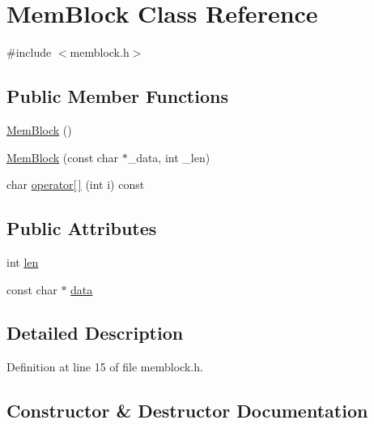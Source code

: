 \hypertarget{class_mem_block}{}\section{Mem\+Block Class Reference}
\label{class_mem_block}


{\ttfamily \#include $<$memblock.\+h$>$}

\subsection*{Public Member Functions}
\begin{DoxyCompactItemize}
\item 
\hyperlink{class_mem_block_a8fdfca8cad8d23202492cc1c6faa1090}{Mem\+Block} ()
\item 
\hyperlink{class_mem_block_af2613f2a070cab85addfe23daa90c4fb}{Mem\+Block} (const char $\ast$\+\_\+data, int \+\_\+len)
\item 
char \hyperlink{class_mem_block_aef890e4e96c0a7e2e1da525388ba02cd}{operator\mbox{[}$\,$\mbox{]}} (int i) const
\end{DoxyCompactItemize}
\subsection*{Public Attributes}
\begin{DoxyCompactItemize}
\item 
int \hyperlink{class_mem_block_a89d82a47f5c01211ef9957a0a527931b}{len}
\item 
const char $\ast$ \hyperlink{class_mem_block_affd84af605d6507c4ff6d30d70c18035}{data}
\end{DoxyCompactItemize}


\subsection{Detailed Description}


Definition at line 15 of file memblock.\+h.



\subsection{Constructor \& Destructor Documentation}
\mbox{\label{class_mem_block_a8fdfca8cad8d23202492cc1c6faa1090}} 
